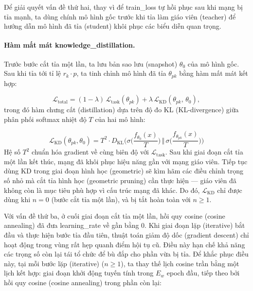             Để giải quyết vấn đề thứ hai, thay vì để \gls{train_loss} tự hồi phục sau khi mạng bị tỉa mạnh, ta dùng chính mô hình gốc trước khi tỉa làm giáo viên (teacher) để hướng dẫn mô hình đã tỉa (student) khôi phục các biểu diễn quan trọng.
            

            \paragraph{\textbf{Hàm mất mát \gls{knowledge_distillation}.}}
            Trước bước cắt tỉa một lần, ta lưu bản sao lưu (snapshot) $\theta_0$ của mô hình gốc. Sau khi tỉa tới tỉ lệ $r_k \cdot p$, ta tinh chỉnh mô hình đã tỉa $\theta_{pk}$ bằng hàm mất mát kết hợp:
             
            \begin{equation}
                \mathcal{L}_\text{total} = (1 - \lambda)\,\mathcal{L}_\text{task}(\theta_{pk}) + \lambda\,\mathcal{L}_\text{KD}(\theta_{pk},\, \theta_0),
                \label{eq:kd_loss}
            \end{equation}
            trong đó hàm chưng cất (distillation) dựa trên độ đo KL (KL-divergence) giữa phân phối softmax nhiệt độ $T$ của hai mô hình:
             
            \begin{equation}
                \mathcal{L}_{\text{KD}}(\theta_{pk}, \theta_0)
                = T^2 \cdot D_{\text{KL}}\Big(
                \sigma\Big(\frac{f_{\theta_0}(x)}{T}\Big)
                \,\Big\Vert\,
                \sigma\Big(\frac{f_{\theta_{pk}}(x)}{T}\Big)
                \Big)
                \label{eq:kd_kl}
            \end{equation}
            Hệ số $T^2$ chuẩn hóa gradient về cùng biên độ với $\mathcal{L}_\text{task}$.
            Sau khi giai đoạn cắt tỉa một lần kết thúc, mạng đã khôi phục hiệu năng gần với mạng giáo viên. Tiếp tục dùng KD trong giai đoạn hình học (geometric) sẽ kìm hãm các điều chỉnh trọng số nhỏ mà cắt tỉa hình học (geometric pruning) cần thực hiện --- giáo viên đã không còn là mục tiêu phù hợp vì cấu trúc mạng đã khác. Do đó, $\mathcal{L}_\text{KD}$ chỉ được dùng khi $n = 0$ (bước cắt tỉa một lần), và bị tắt hoàn toàn với $n \geq 1$.


            Với vấn đề thứ ba, ở cuối giai đoạn cắt tỉa một lần, hồi quy cosine (cosine annealing) đã đưa \gls{learning_rate} về gần bằng 0. Khi giai đoạn lặp (iterative) bắt đầu và thực hiện bước tỉa đầu tiên, thuật toán giảm độ dốc (gradient descent) chỉ hoạt động trong vùng rất hẹp quanh điểm hội tụ cũ. Điều này hạn chế khả năng các trọng số còn lại tái tổ chức để bù đắp cho phần vừa bị tỉa.
            Để khắc phục điều này, tại mỗi bước lặp (iterative) ($n \geq 1$), ta thay thế lịch cosine trần bằng một lịch kết hợp: giai đoạn khởi động tuyến tính trong $E_w$ epoch đầu, tiếp theo bởi hồi quy cosine (cosine annealing) trong phần còn lại:

